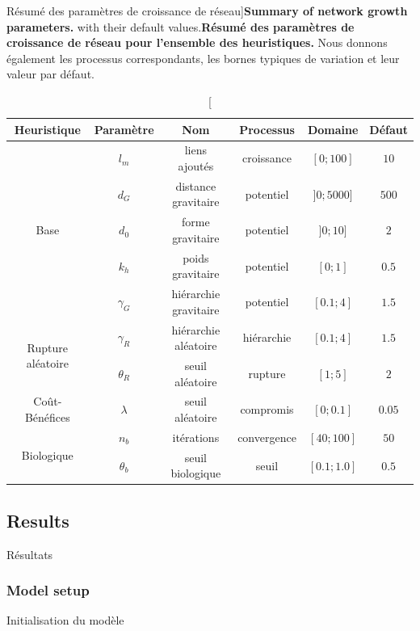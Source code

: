 \begin{table}
\caption[Summary of network growth parameters][Résumé des paramètres de croissance de réseau]{\textbf{Summary of network growth parameters.} with their default values.\label{tab:networkgrowth:parameters}}{\textbf{Résumé des paramètres de croissance de réseau pour l'ensemble des heuristiques.} Nous donnons également les processus correspondants, les bornes typiques de variation et leur valeur par défaut.\label{tab:networkgrowth:parameters}}
\begin{tabular}{|c|c|c|c|c|c|}
  \hline
Heuristique & Paramètre & Nom & Processus & Domaine & Défaut\\
  \hline
\multirow{5}{*}{Base}& $l_m$ & liens ajoutés & croissance & $[0;100]$ & $10$ \\\cline{2-6}
 & $d_G$ & distance gravitaire & potentiel & $]0;5000]$ & $500$ \\\cline{2-6}
 & $d_0$ & forme gravitaire & potentiel & $]0;10]$ & $2$ \\\cline{2-6}
 & $k_h$ & poids gravitaire & potentiel & $[0;1]$ & $0.5$ \\\cline{2-6}
 & $\gamma_G$ & hiérarchie gravitaire & potentiel & $[0.1;4]$ & $1.5$ \\\hline
\multirow{2}{*}{Rupture aléatoire}& $\gamma_R$ & hiérarchie aléatoire & hiérarchie & $[0.1;4]$ & $1.5$ \\\cline{2-6}
& $\theta_R$ & seuil aléatoire & rupture & $[1;5]$ & $2$ \\\hline
Coût-Bénéfices& $\lambda$ & seuil aléatoire & compromis & $[0;0.1]$ & $0.05$ \\\hline
\multirow{2}{*}{Biologique}& $n_b$ & itérations & convergence & $[40;100]$ & $50$ \\\cline{2-6}
& $\theta_b$ & seuil biologique & seuil & $[0.1;1.0]$ & $0.5$ \\\hline
\end{tabular}
\end{table}






\subsection{Results}{Résultats}


\subsubsection{Model setup}{Initialisation du modèle}

